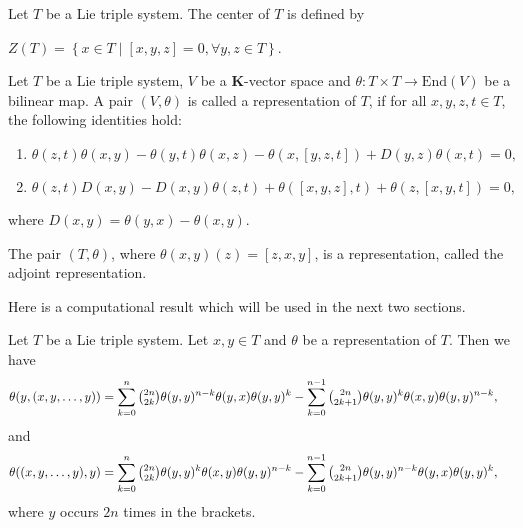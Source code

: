 \documentclass[11pt, twoside]{article}
\begin{document}
\begin{defi}
     Let $T$ be a Lie triple system. The center of $T$ is defined by \begin{center}
        $Z(T)=\left\{x\in T \mid [x,y,z]=0, \forall y,z\in T \right\}  $.
    \end{center}
\end{defi}

\begin{defi}\cite{Y60}
    Let $T$ be a Lie triple system, $V$ be a $\mathbf{K}$-vector space and $\theta:T\times T\to \mathrm{End}(V) $ be a bilinear map. A pair $(V,\theta)$ is called a representation of $T$, if for all $x,y,z,t\in T$, the following identities hold:
           \begin{enumerate}
           \item 
               \begin{equation}\label{rep1}
                   \theta(z,t)\theta(x,y)-\theta(y,t)\theta(x,z)-\theta(x,[y,z,t]) + D(y,z)\theta(x,t)=0,
               \end{equation}
               \item \begin{equation}\label{rep2}
                   \theta(z,t)D(x,y)-D(x,y)\theta(z,t)+\theta([x,y,z],t)+ \theta(z,[x,y,t])=0,
               \end{equation}
          \end{enumerate} where $D(x,y)=\theta(y,x)-\theta(x,y) $.
\end{defi}

\begin{ex}
    The pair $(T,\theta)$, where $\theta(x,y)(z)=[z,x,y] $, is a representation, called the adjoint representation.
\end{ex}

Here is a computational result which will be used in the next two sections.

\begin{prop}\label{p5.14}\cite{BM26}
    Let $T$ be a Lie triple system. Let $x,y\in T $ and $\theta$ be a representation of $T$. Then we have \begin{align*}
      &  \theta(y,(x,y,\dots,y))= \sum\limits_{k=0}^n\tbinom{2n}{2k}\theta(y,y)^{n-k}\theta(y,x)\theta(y,y)^k - \sum\limits_{k=0}^{n-1}\tbinom{2n}{2k+1}\theta(y,y)^k\theta(x,y)\theta(y,y)^{n-k} ,
    \end{align*} and \begin{align*}
       & \theta((x,y,\dots,y),y)= \sum\limits_{k=0}^n\tbinom{2n}{2k}\theta(y,y)^k\theta(x,y)\theta(y,y)^{n-k} - \sum\limits_{k=0}^{n-1}\tbinom{2n}{2k+1}\theta(y,y)^{n-k}\theta(y,x)\theta(y,y)^k ,
    \end{align*} where $y$ occurs $2n$ times in the brackets.
\end{prop}
\end{document}
